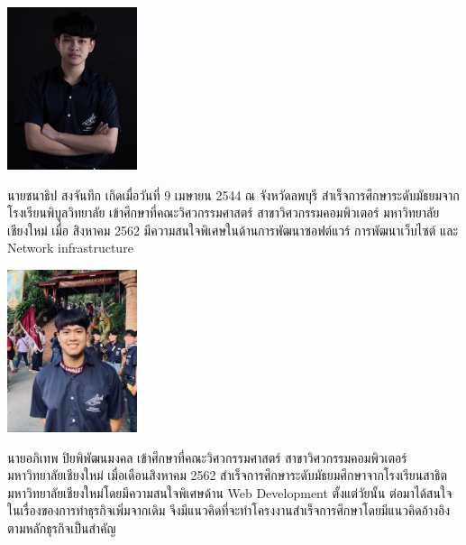 \documentclass[final]{cpecmu}
\author{นายชนาธิป สงจันทึก}{Chanathip Songchanthuek}{620612145}
\author{นายอภิเทพ ปิยพิพัฒนมงคล}{Apithep Piyaphiphathanamongkol}{620612168}
\begin{document}


\pagestyle{empty}\cleardoublepage
\normalspacing \setcounter{page}{1}  \pagestyle{cpecmu}





\ifproject

\fi



\ifproject
\normalspacing
\appendix


\ifglossary\glossarypage\fi

\ifindex\indexpage\fi

\begin{biosketch}
\begin{center}
  \includegraphics[width=1.5in]{./image/profile_bank.jpg}
\end{center}
นายชนาธิป สงจันทึก เกิดเมื่อวันที่ 9 เมษายน 2544 ณ จังหวัดลพบุรี สําเร็จการศึกษาระดับมัธยมจากโรงเรียนพิบูลวิทยาลัย เข้าศึกษาที่คณะวิศวกรรมศาสตร์ สาขาวิศวกรรมคอมพิวเตอร์ มหาวิทยาลัยเชียงใหม่ เมื่อ สิงหาคม 2562 มีความสนใจพิเศษในด้านการพัฒนาซอฟต์แวร์ การพัฒนาเว็บไซต์ และ Network infrastructure

\begin{center}
  \includegraphics[width=1.5in]{./image/profile_kao.png}
\end{center}
นายอภิเทพ ปิยพิพัฒนมงคล เข้าศึกษาที่คณะวิศวกรรมศาสตร์ สาขาวิศวกรรมคอมพิวเตอร์ มหาวิทยาลัยเชียงใหม่ เมื่อเดือนสิงหาคม 2562 สำเร็จการศึกษาระดับมัธยมศึกษาจากโรงเรียนสาธิตมหาวิทยาลัยเชียงใหม่โดยมีความสนใจพิเศษด้าน Web Development ตั้งแต่วัยนั้น ต่อมาได้สนใจในเรื่องของการทำธุรกิจเพิ่มจากเดิม จึงมีแนวคิดที่จะทำโครงงานสำเร็จการศึกษาโดยมีแนวคิดอ้างอิงตามหลักธุรกิจเป็นสำคัญ
\end{biosketch}
\fi %
\end{document}
